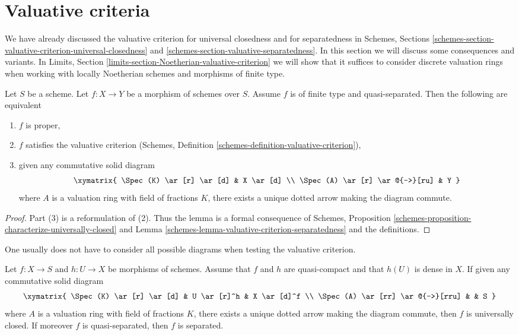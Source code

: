 \section{Valuative criteria}
\label{section-valuative-criteria}

\noindent
We have already discussed the valuative criterion for universal closedness
and for separatedness in Schemes, Sections
\ref{schemes-section-valuative-criterion-universal-closedness} and
\ref{schemes-section-valuative-separatedness}.
In this section we will discuss some consequences and variants.
In Limits, Section \ref{limits-section-Noetherian-valuative-criterion}
we will show that it suffices to consider discrete valuation
rings when working with locally Noetherian schemes and
morphisms of finite type.

\begin{lemma}
\label{lemma-characterize-proper}
Let $S$ be a scheme. Let $f : X \to Y$ be a morphism of schemes
over $S$. Assume $f$ is of finite type and quasi-separated.
Then the following are equivalent
\begin{enumerate}
\item $f$ is proper,
\item $f$ satisfies the valuative criterion
(Schemes, Definition \ref{schemes-definition-valuative-criterion}),
\item given any commutative solid diagram
$$
\xymatrix{
\Spec(K) \ar[r] \ar[d] & X \ar[d] \\
\Spec(A) \ar[r] \ar@{-->}[ru] & Y
}
$$
where $A$ is a valuation ring with field of fractions $K$, there exists
a unique dotted arrow making the diagram commute.
\end{enumerate}
\end{lemma}

\begin{proof}
Part (3) is a reformulation of (2). Thus the lemma is a formal
consequence of
Schemes, Proposition \ref{schemes-proposition-characterize-universally-closed}
and Lemma \ref{schemes-lemma-valuative-criterion-separatedness}
and the definitions.
\end{proof}

\noindent
One usually does not have to consider all possible diagrams
when testing the valuative criterion.

\begin{lemma}
\label{lemma-refined-valuative-criterion-universally-closed}
Let $f : X \to S$ and $h : U \to X$ be morphisms of schemes.
Assume that $f$ and $h$ are quasi-compact and that $h(U)$ is dense in $X$.
If given any commutative solid diagram
$$
\xymatrix{
\Spec(K) \ar[r] \ar[d] & U \ar[r]^h & X \ar[d]^f \\
\Spec(A) \ar[rr] \ar@{-->}[rru] & & S
}
$$
where $A$ is a valuation ring with field of fractions $K$, there
exists a unique dotted arrow making the diagram commute, then $f$
is universally closed. If moreover $f$ is quasi-separated, then
$f$ is separated.
\end{lemma}

